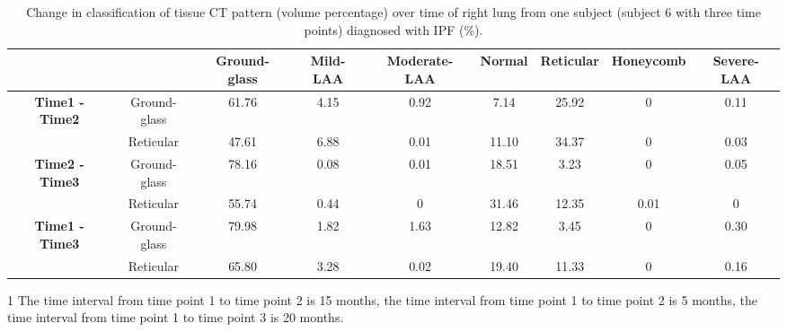 \begin{landscape}
\begin{table}[p]
\centering
\caption{Change in classification of tissue CT pattern (volume percentage) over time of right lung from one subject (subject 6 with three time points) diagnosed with IPF (\%).}
\label{tab:ChangeOverTimeRight}
\begin{tabular}{c c c c c c c c c}
\hline
\quad & \quad & \bf{Ground-glass} &	\bf{Mild-LAA} &	\bf{Moderate-LAA} &	\bf{Normal} &	\bf{Reticular} &	\bf{Honeycomb} &	\bf{Severe-LAA}\\
\hline
\bf{Time1 - Time2} &	Ground-glass &	61.76 &	4.15 &	0.92 &	7.14 &	25.92 &	0 &	0.11\\
\quad & Reticular	& 47.61 &	6.88 &	0.01 &	11.10 &	34.37 &	0 &	0.03\\
\hline
\bf{Time2 - Time3} &	Ground-glass &	78.16 &	0.08 &	0.01 &	18.51 &	3.23 &	0 &	0.05\\
\quad & Reticular &	55.74 &	0.44 &	0 &	31.46 &	12.35 &	0.01 &	0\\
\hline
\bf{Time1 - Time3} &	Ground-glass &	79.98 &	1.82 &	1.63 &	12.82 &	3.45 &	0 &	0.30\\
\quad & Reticular &	65.80 &	3.28 &	0.02 &	19.40 &	11.33 &	0 &	0.16\\
\hline
\end{tabular}
\begin{tablenotes}
  \item[1] The time interval from time point 1 to time point 2 is 15 months, the time interval from time point 1 to time point 2 is 5 months, the time interval from time point 1 to time point 3 is 20 months.
\end{tablenotes}
\end{table}
\end{landscape}
\restoregeometry %

